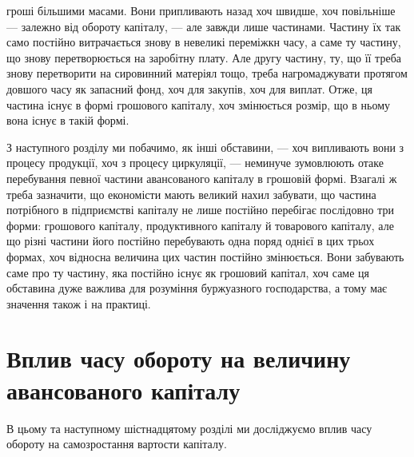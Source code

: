 \parcont{}  %
гроші більшими масами. Вони припливають назад хоч швидше, хоч повільніше
— залежно від обороту капіталу, — але завжди лише частинами.
Частину їх так само постійно витрачається знову в невеликі переміжкн
часу, а саме ту частину, що знову перетворюється на заробітну плату.
Але другу частину, ту, що її треба знову перетворити на сировинний
матеріял тощо, треба нагромаджувати протягом довшого часу як запасний
фонд, хоч для закупів, хоч для виплат. Отже, ця частина існує в формі
грошового капіталу, хоч змінюється розмір, що в ньому вона існує в
такій формі.

З наступного розділу ми побачимо, як інші обставини, — хоч випливають
вони з процесу продукції, хоч з процесу циркуляції, — неминуче
зумовлюють отаке перебування певної частини авансованого капіталу в
грошовій формі. Взагалі ж треба зазначити, що економісти мають великий
нахил забувати, що частина потрібного в підприємстві капіталу не лише
постійно перебігає послідовно три форми: грошового капіталу, продуктивного
капіталу й товарового капіталу, але що різні частини його постійно
перебувають одна поряд однієї в цих трьох формах, хоч відносна
величина цих частин постійно змінюється. Вони забувають саме про ту
частину, яка постійно існує як грошовий капітал, хоч саме ця обставина
дуже важлива для розуміння буржуазного господарства, а тому має значення
також і на практиці.

\section{Вплив часу обороту на величину авансованого капіталу}

В цьому та наступному шістнадцятому розділі ми досліджуємо вплив
часу обороту на самозростання вартости капіталу.

